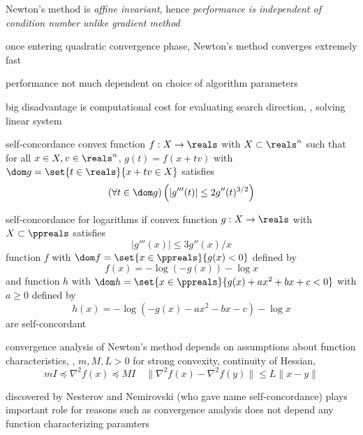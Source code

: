\documentclass[17pt,landscape]{foils}
\begin{document}
{

\bit
\item
	Newton's method is \emph{affine invariant},
	hence \emph{performance is independent of condition number unlike gradient method}

\vitem
	once entering quadratic convergence phase,
	Newton's method converges extremely fast

\vitem
	performance not much dependent on choice of algorithm parameters

\vitem
	big disadvantage is
	computational cost for evaluating search direction,
	\ie, solving linear system
\eit
\vfill



\begin{mydefinition}{self-concordance}
	convex function $f:X\to \reals$
	with $X\subset \reals^n$
	such that
	for all $x\in X, v\in\reals^n$,
	$g(t) = f(x+tv)$
	with $\dom g = \set{t\in\reals}{x+tv\in X}$
	satisfies
	$$
		\left(
			\forall t\in\dom g
		\right)
		\left(
			|g'''(t)| \leq 2 g''(t)^{3/2}
		\right)
	$$
\end{mydefinition}
\vfill

\begin{myproposition}{self-concordance for logarithms}
	if convex function $g:X\to\reals$ with $X\subset \ppreals$
	satisfies
	$$
		|g'''(x)| \leq 3 g''(x) / x
	$$
	function $f$ with $\dom f = \set{x\in\ppreals}{g(x)<0}$
	defined by
	$$
		f(x) = -\log(-g(x)) - \log x
	$$
	and
	function $h$ with $\dom h = \set{x\in\ppreals}{g(x)+ax^2+bx + c<0}$
	with $a\geq0$
	defined by
	$$
		h(x) = -\log(-g(x)-ax^2-bx-c) - \log x
	$$
	are self-concordant
\end{myproposition}
\vfill



\bit
\item
	convergence analysis of Newton's method depends on
	assumptions about function characteristics,
	\eg,
	$m,M, L > 0$
	for strong convexity, continuity of Hessian,
	\ie\
	$$
		m I \preceq \nabla^2 f(x) \preceq M I
			\quad
		\|\nabla^2 f(x)- \nabla^2f(y)\| \leq L \|x-y\|
	$$

\vitem
	discovered by Nesterov and Nemirovski
	(who gave name self-concordance)
	plays important role
	for reasons
	such as
	\bit
	\vitem
		convergence analysis does not depend any function characterizing paramters

}
\end{document}
